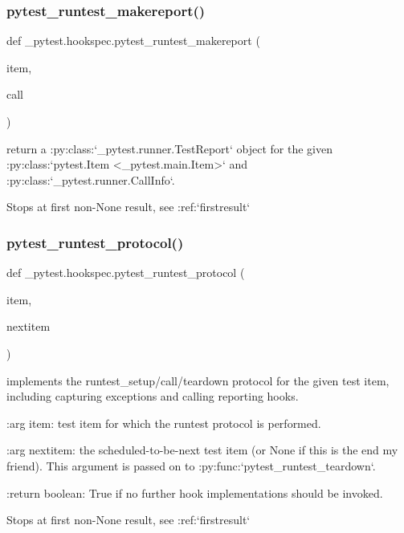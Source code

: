 \subsubsection{\texorpdfstring{pytest\+\_\+runtest\+\_\+makereport()}{pytest\_runtest\_makereport()}}
{\footnotesize\ttfamily def \+\_\+pytest.\+hookspec.\+pytest\+\_\+runtest\+\_\+makereport (\begin{DoxyParamCaption}\item[{}]{item,  }\item[{}]{call }\end{DoxyParamCaption})}

\begin{DoxyVerb}return a :py:class:`_pytest.runner.TestReport` object
for the given :py:class:`pytest.Item <_pytest.main.Item>` and
:py:class:`_pytest.runner.CallInfo`.

Stops at first non-None result, see :ref:`firstresult` \end{DoxyVerb}
 \mbox{\label{namespace__pytest_1_1hookspec_ac4f82157222aa0ffa3d12e214deafdff}} 
\subsubsection{\texorpdfstring{pytest\+\_\+runtest\+\_\+protocol()}{pytest\_runtest\_protocol()}}
{\footnotesize\ttfamily def \+\_\+pytest.\+hookspec.\+pytest\+\_\+runtest\+\_\+protocol (\begin{DoxyParamCaption}\item[{}]{item,  }\item[{}]{nextitem }\end{DoxyParamCaption})}

\begin{DoxyVerb}implements the runtest_setup/call/teardown protocol for
the given test item, including capturing exceptions and calling
reporting hooks.

:arg item: test item for which the runtest protocol is performed.

:arg nextitem: the scheduled-to-be-next test item (or None if this
               is the end my friend).  This argument is passed on to
               :py:func:`pytest_runtest_teardown`.

:return boolean: True if no further hook implementations should be invoked.


Stops at first non-None result, see :ref:`firstresult` \end{DoxyVerb}
 \mbox{\label{namespace__pytest_1_1hookspec_a29020e1331bc418fab32ef119c805d49}} 
